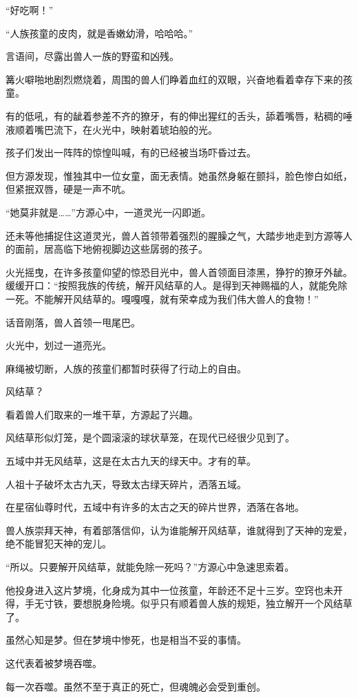 \begin{this_body}
“好吃啊！”

“人族孩童的皮肉，就是香嫩幼滑，哈哈哈。”

言语间，尽露出兽人一族的野蛮和凶残。

篝火噼啪地剧烈燃烧着，周围的兽人们睁着血红的双眼，兴奋地看着幸存下来的孩童。

有的低吼，有的龇着参差不齐的獠牙，有的伸出猩红的舌头，舔着嘴唇，粘稠的唾液顺着嘴巴流下，在火光中，映射着琥珀般的光。

孩子们发出一阵阵的惊惶叫喊，有的已经被当场吓昏过去。

但方源发现，惟独其中一位女童，面无表情。她虽然身躯在颤抖，脸色惨白如纸，但紧抿双唇，硬是一声不吭。

“她莫非就是……”方源心中，一道灵光一闪即逝。

还未等他捕捉住这道灵光，兽人首领带着强烈的腥臊之气，大踏步地走到方源等人的面前，居高临下地俯视脚边这些孱弱的孩子。

火光摇曳，在许多孩童仰望的惊恐目光中，兽人首领面目漆黑，狰狞的獠牙外龇。缓缓开口：“按照我族的传统，解开风结草的人。是得到天神赐福的人，就能免除一死。不能解开风结草的。嘎嘎嘎，就有荣幸成为我们伟大兽人的食物！”

话音刚落，兽人首领一甩尾巴。

火光中，划过一道亮光。

麻绳被切断，人族的孩童们都暂时获得了行动上的自由。

风结草？

看着兽人们取来的一堆干草，方源起了兴趣。

风结草形似灯笼，是个圆滚滚的球状草笼，在现代已经很少见到了。

五域中并无风结草，这是在太古九天的绿天中。才有的草。

人祖十子破坏太古九天，导致太古绿天碎片，洒落五域。

在星宿仙尊时代，五域中有许多的太古之天的碎片世界，洒落在各地。

兽人族崇拜天神，有着部落信仰，认为谁能解开风结草，谁就得到了天神的宠爱，绝不能冒犯天神的宠儿。

“所以。只要解开风结草，就能免除一死吗？”方源心中急速思索着。

他投身进入这片梦境，化身成为其中一位孩童，年龄还不足十三岁。空窍也未开得，手无寸铁，要想脱身险境。似乎只有顺着兽人族的规矩，独立解开一个风结草了。

虽然心知是梦。但在梦境中惨死，也是相当不妥的事情。

这代表着被梦境吞噬。

每一次吞噬。虽然不至于真正的死亡，但魂魄必会受到重创。


\end{this_body}
